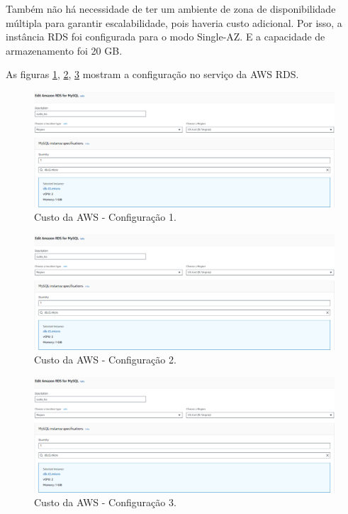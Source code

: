 Também não há necessidade de ter um ambiente de zona de disponibilidade múltipla para garantir escalabilidade, pois haveria custo adicional. Por isso, a instância RDS foi configurada para o modo Single-AZ. E a capacidade de armazenamento foi 20 GB.

As figuras \ref{figure:custo_aws_configuracao_1}, \ref{figure:custo_aws_configuracao_2}, \ref{figure:custo_aws_configuracao_3} mostram a configuração no serviço da AWS RDS.

\begin{figure}[hp]
    \centering
    
    \includegraphics[scale=0.5]{figures/custo_aws_configuracao.PNG}
    \caption{Custo da AWS - Configuração 1.}
    \label{figure:custo_aws_configuracao_1}
    
\end{figure}

\begin{figure}[hp]
    \centering
    
    \includegraphics[scale=0.5]{figures/custo_aws_configuracao.PNG}
    \caption{Custo da AWS - Configuração 2.}
    \label{figure:custo_aws_configuracao_2}
    
\end{figure}

\begin{figure}[hp]
    \centering
    
    \includegraphics[scale=0.5]{figures/custo_aws_configuracao.PNG}
    \caption{Custo da AWS - Configuração 3.}
    \label{figure:custo_aws_configuracao_3}
    
\end{figure}